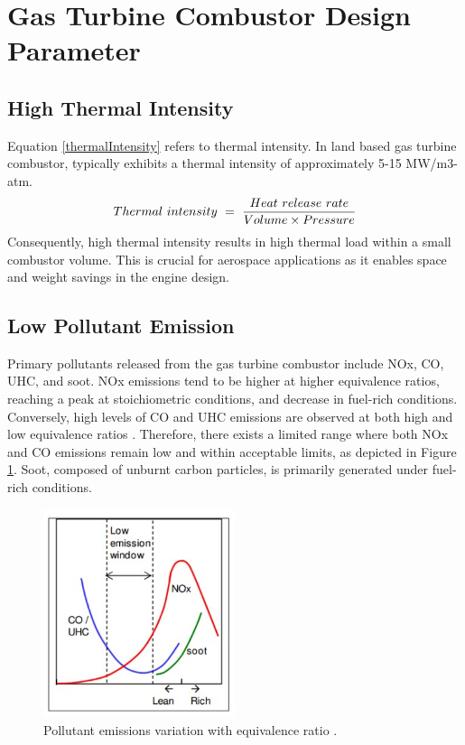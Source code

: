 \section{Gas Turbine Combustor Design Parameter}
\subsection{High Thermal Intensity}
Equation \ref{thermalIntensity} refers to thermal intensity. In land based gas turbine combustor, typically exhibits a thermal intensity of approximately 5-15 MW/m3-atm. 
\begin{equation}{\label{thermalIntensity}}
    Thermal\ intensity\ = \ \frac{Heat\ release\ rate}{Volume \times Pressure}
\end{equation}
Consequently, high thermal intensity results in high thermal load within a small combustor volume. This is crucial for aerospace applications as it enables space and weight savings in the engine design.

\subsection{Low Pollutant Emission}
Primary pollutants released from the gas turbine combustor include NOx, CO, UHC, and soot. NOx emissions tend to be higher at higher equivalence ratios, reaching a peak at stoichiometric conditions, and decrease in fuel-rich conditions. Conversely, high levels of CO and UHC emissions are observed at both high and low equivalence ratios \cite{AGARWAL20171}. Therefore, there exists a limited range where both NOx and CO emissions remain low and within acceptable limits, as depicted in Figure \ref{PollEq}. Soot, composed of unburnt carbon particles, is primarily generated under fuel-rich conditions.
\begin{figure}[ht]
	\centering
	\includegraphics[width=0.5\textwidth]{Chapter1/Images/emissionWithEq.jpeg}
	\caption[Pollutant emissions variation with equivalence ratio]{Pollutant emissions variation with equivalence ratio \cite{SKG2017}.}
	\label{PollEq}
\end{figure}

